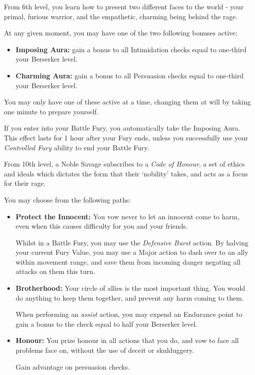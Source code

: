 {
	From 6th level, you learn how to present two different faces to the world - your primal, furious warrior, and the empathetic, charming being behind the rage. 

	At any given moment, you may have one of the two following bonuses active:
	\begin{itemize}
		\item {\bf Imposing Aura:} gain a bonus to all Intimidation checks equal to one-third your Berserker level. 
		\item {\bf Charming Aura:} gain a bonus to all Persuasion checks equal to one-third your Berserker level. 
	\end{itemize}
	
	You may only have one of these active at a time, changing them at will by taking one minute to prepare yourself. 
	
	If you enter into your Battle Fury, you automatically take the Imposing Aura. This effect lasts for 1 hour after your Fury ends, unless you successfully use your {\it Controlled Fury} ability to end your Battle Fury.   
}

{
	From 10th level, a Noble Savage subscribes to a {\it Code of Honour}, a set of ethics and ideals which dictates the form that their `nobility' takes, and acts as a focus for their rage. 
	
	You may choose from the following paths:
	
	\newcommand\code[3]
	{
		\item {\bf #1:} #2
		
		#3
		
		
	}
	
	\begin{itemize}
		\code{Protect the Innocent}{You vow never to let an innocent come to harm, even when this causes difficulty for you and your friends.}{Whilst in a Battle Fury, you may use the {\it Defensive Burst} action. By halving your current Fury Value, you may use a Major action to dash over to an ally within movement range, and save them from incoming danger \minus{} negating all attacks on them this turn. }
		\code{Brotherhood}{Your circle of allies is the most important thing. You would do anything to keep them together, and prevent any harm coming to them.}{When performing an {\it assist} action, you may expend an Endurance point to gain a bonus to the check equal to half your Berserker level.}
		\code{Honour}{You prize honour in all actions that you do, and vow to face all problems face on, without the use of deceit or skulduggery.}{Gain advantage on persuasion checks. }
	\end{itemize}
}
